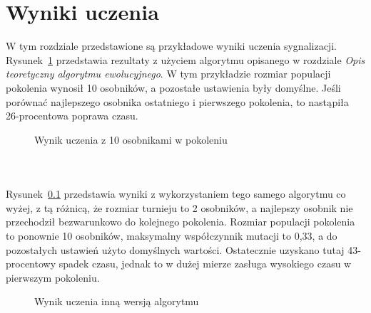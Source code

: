 \chapter*{Wyniki uczenia}
W tym rozdziale przedstawione są przykładowe wyniki uczenia sygnalizacji.\\
Rysunek~\ref{fig:evoA} przedstawia rezultaty z użyciem algorytmu opisanego w rozdziale \textit{Opis teoretyczny algorytmu ewolucyjnego}. W tym przykładzie rozmiar populacji pokolenia wynosił 10 osobników, a pozostałe ustawienia były domyślne. Jeśli porównać najlepszego osobnika  ostatniego i pierwszego pokolenia, to nastąpiła 26-procentowa poprawa czasu.
\evoA
\begin{figure}[h]
	\centering
	\caption{Wynik uczenia z 10 osobnikami w pokoleniu}
	\label{fig:evoA}
\end{figure}\\
\paragraph{}Rysunek~\ref{fig:evoB} przedstawia wyniki z wykorzystaniem tego samego algorytmu co wyżej, z tą różnicą, że rozmiar turnieju to 2 osobników, a najlepszy osobnik nie przechodził bezwarunkowo do kolejnego pokolenia. Rozmiar populacji pokolenia to ponownie 10 osobników, maksymalny współczynnik mutacji to 0,33, a do pozostałych ustawień użyto domyślnych wartości. Ostatecznie uzyskano tutaj 43-procentowy spadek czasu, jednak to w dużej mierze zasługa wysokiego czasu w pierwszym pokoleniu.
\evoB
\begin{figure}[h]
	\centering
	\caption{Wynik uczenia inną wersją algorytmu}
	\label{fig:evoB}
\end{figure}
